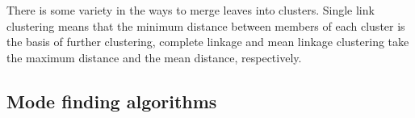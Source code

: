 There is some variety in the ways to merge leaves into clusters. Single link clustering means that the minimum distance between members of each cluster is the basis of further clustering, complete linkage and mean linkage clustering take the maximum distance and the mean distance, respectively.



\subsection{Mode finding algorithms} %
\label{sub:mode_finding_algorithms}




